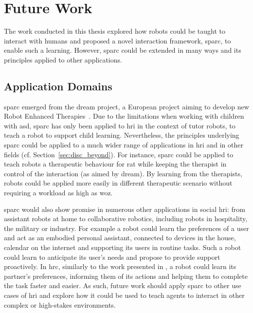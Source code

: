 \section{Future Work}

The work conducted in this thesis explored how robots could be taught to interact with humans and proposed a novel interaction framework, \gls{sparc}, to enable such a learning. However, \gls{sparc} could be extended in many ways and its principles applied to other applications.

\subsection{Application Domains}

\gls{sparc} emerged from the \acrshort{dream} project, a European project aiming to develop new Robot Enhanced Therapies~\citep{thill2012robot,esteban2017build}. Due to the limitations when working with children with \gls{asd}, \gls{sparc} has only been applied to \gls{hri} in the context of tutor robots, to teach a robot to support child learning. Nevertheless, the principles underlying \gls{sparc} could be applied to a much wider range of applications in \gls{hri} and in other fields (cf. Section~\ref{sec:disc_beyond}). For instance, \gls{sparc} could be applied to teach robots a therapeutic behaviour for \gls{rat} while keeping the therapist in control of the interaction (as aimed by \acrshort{dream}). By learning from the therapists, robots could be applied more easily in different therapeutic scenario without requiring a workload as high as \gls{woz}. 

\gls{sparc} would also show promise in numerous other applications in social \gls{hri}: from assistant robots at home to collaborative robotics, including robots in hospitality, the military or industry. For example a robot could learn the preferences of a user and act as an embodied personal assistant, connected to devices in the house, calendar on the internet and supporting its users in routine tasks. Such a robot could learn to anticipate its user's needs and propose to provide support proactively. In \gls{hrc}, similarly to the work presented in \cite{munzer2017efficient}, a robot could learn its partner's preferences, informing them of its actions and helping them to complete the task faster and easier. As such, future work should apply \gls{sparc} to other use cases of \gls{hri} and explore how it could be used to teach agents to interact in other complex or high-stakes environments.

